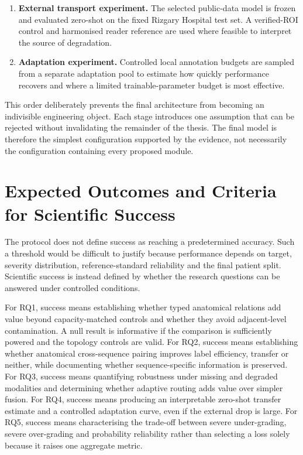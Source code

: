 \begin{enumerate}
  \item \textbf{External transport experiment.} The selected public-data model is
        frozen and evaluated zero-shot on the fixed Rizgary Hospital test set. A
        verified-ROI control and harmonised reader reference are used where feasible
        to interpret the source of degradation.

  \item \textbf{Adaptation experiment.} Controlled local annotation budgets are
        sampled from a separate adaptation pool to estimate how quickly performance
        recovers and where a limited trainable-parameter budget is most effective.
\end{enumerate}

This order deliberately prevents the final architecture from becoming an indivisible
engineering object. Each stage introduces one assumption that can be rejected
without invalidating the remainder of the thesis. The final model is therefore the
simplest configuration supported by the evidence, not necessarily the configuration
containing every proposed module.

\section{Expected Outcomes and Criteria for Scientific Success}
\label{sec:intro-success}

The protocol does not define success as reaching a predetermined accuracy. Such a
threshold would be difficult to justify because performance depends on target,
severity distribution, reference-standard reliability and the final patient split.
Scientific success is instead defined by whether the research questions can be
answered under controlled conditions.

For RQ1, success means establishing whether typed anatomical relations add value
beyond capacity-matched controls and whether they avoid adjacent-level
contamination. A null result is informative if the comparison is sufficiently
powered and the topology controls are valid. For RQ2, success means establishing
whether anatomical cross-sequence pairing improves label efficiency, transfer or
neither, while documenting whether sequence-specific information is preserved. For
RQ3, success means quantifying robustness under missing and degraded modalities and
determining whether adaptive routing adds value over simpler fusion. For RQ4,
success means producing an interpretable zero-shot transfer estimate and a controlled
adaptation curve, even if the external drop is large. For RQ5, success means
characterising the trade-off between severe under-grading, severe over-grading and
probability reliability rather than selecting a loss solely because it raises one
aggregate metric.

